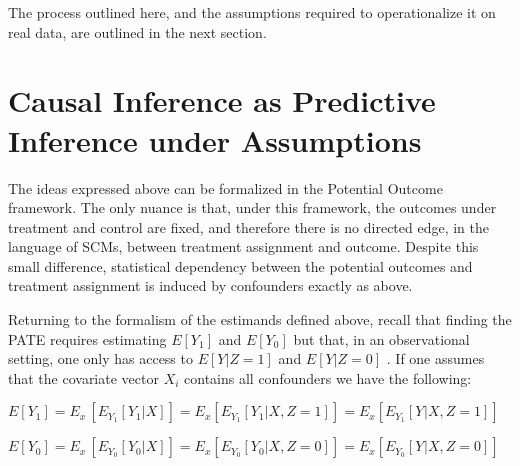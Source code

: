 \documentclass[../main.tex]{subfiles}
\begin{document}
\vspace{\baselineskip}

The process outlined here, and the assumptions required to operationalize it on real data, are outlined in the next section.\par

\section{Causal Inference as Predictive Inference under Assumptions}

\vspace{\baselineskip}
The ideas expressed above can be formalized in the Potential Outcome framework. The only nuance is that, under this framework, the outcomes under treatment and control are fixed, and therefore there is no directed edge, in the language of SCMs, between treatment assignment and outcome. Despite this small difference, statistical dependency between the potential outcomes and treatment assignment is induced by confounders exactly as above.\par


\vspace{\baselineskip}
Returning to the formalism of the estimands defined above, recall that finding the PATE requires estimating  \( E \left[ Y_{1} \right]  \) and  \( E \left[ Y_{0} \right]  \)  but that, in an observational setting, one only has access to  \( E \left[ Y \vert  Z = 1 \right]  \)  and  \( E \left[ Y \vert  Z=0  \right]  \) . If one assumes that the covariate vector  \( X_{i} \) contains all confounders we have the following:\par


\vspace{\baselineskip}
\begin{adjustwidth}{0.5in}{0.0in}
 \( E \left[ Y_{1} \right]  = E_{x~} \left[  E_{Y_{1}} \left[ Y_{1}  \vert  X \right]   \right]  = E_{x} \left[ E_{Y_{1}} \left[ Y_{1}  \vert  X, Z=1 \right]  \right]  =E_{x} \left[ E_{Y_{1}} \left[ Y_{}  \vert  X, Z=1 \right]  \right]  \) \par

\end{adjustwidth}

\begin{adjustwidth}{0.5in}{0.0in}
 \( E \left[ Y_{0} \right]  = E_{x~} \left[  E_{Y_{0}} \left[ Y_{0}  \vert  X \right]   \right]  = E_{x} \left[ E_{Y_{0}} \left[ Y_{0}  \vert  X, Z=0 \right]  \right]  =E_{x} \left[ E_{Y_{0}} \left[ Y_{}  \vert  X, Z=0 \right]  \right]  \) \par

\end{adjustwidth}
\end{document}
